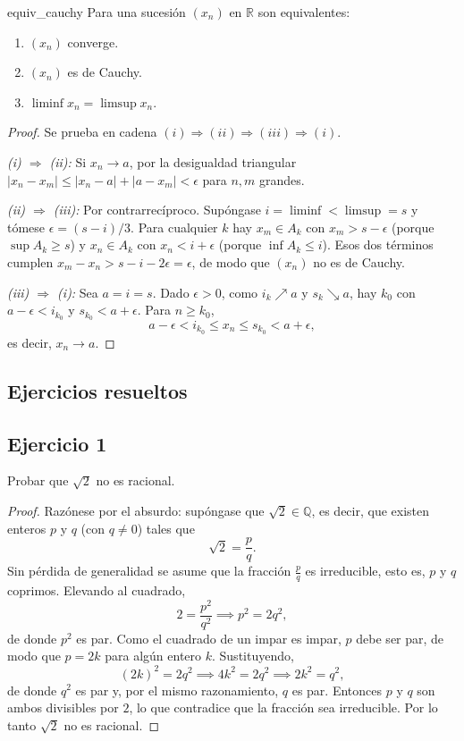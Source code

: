 \documentclass[11pt, a4paper]{article}
\begin{document}
\begin{teorema}{}{equiv_cauchy}
Para una sucesión $(x_n)$ en $\mathbb{R}$ son equivalentes:
\begin{enumerate}
    \item[i)] $(x_n)$ converge.
    \item[ii)] $(x_n)$ es de Cauchy.
    \item[iii)] $\liminf x_n = \limsup x_n$.
\end{enumerate}
\end{teorema}

\begin{proof}
Se prueba en cadena $(i) \Rightarrow (ii) \Rightarrow (iii) \Rightarrow (i)$.

\textit{(i) $\Rightarrow$ (ii):} Si $x_n \to a$, por la desigualdad triangular
$|x_n - x_m| \le |x_n - a| + |a - x_m| < \epsilon$ para $n, m$ grandes.

\textit{(ii) $\Rightarrow$ (iii):} Por contrarrecíproco. Supóngase $i = \liminf < \limsup = s$ y
tómese $\epsilon = (s-i)/3$. Para cualquier $k$ hay $x_m \in A_k$ con $x_m > s - \epsilon$ (porque
$\sup A_k \ge s$) y $x_n \in A_k$ con $x_n < i + \epsilon$ (porque $\inf A_k \le i$). Esos dos
términos cumplen $x_m - x_n > s - i - 2\epsilon = \epsilon$, de modo que $(x_n)$ no es de Cauchy.

\textit{(iii) $\Rightarrow$ (i):} Sea $a = i = s$. Dado $\epsilon > 0$, como $i_k \nearrow a$ y
$s_k \searrow a$, hay $k_0$ con $a - \epsilon < i_{k_0}$ y $s_{k_0} < a + \epsilon$. Para
$n \ge k_0$,
$$ a - \epsilon < i_{k_0} \le x_n \le s_{k_0} < a + \epsilon, $$
es decir, $x_n \to a$.
\end{proof}

\newpage

\subsection{Ejercicios resueltos}

\subsection*{Ejercicio 1}

Probar que $\sqrt{2}$ no es racional.

\begin{proof}
Razónese por el absurdo: supóngase que $\sqrt{2} \in \mathbb{Q}$, es decir, que existen enteros $p$
y $q$ (con $q \neq 0$) tales que
$$ \sqrt{2} = \frac{p}{q}. $$
Sin pérdida de generalidad se asume que la fracción $\frac{p}{q}$ es irreducible, esto es, $p$ y $q$
coprimos. Elevando al cuadrado,
$$ 2 = \frac{p^2}{q^2} \implies p^2 = 2q^2, $$
de donde $p^2$ es par. Como el cuadrado de un impar es impar, $p$ debe ser par, de modo que $p = 2k$ para
algún entero $k$. Sustituyendo,
$$ (2k)^2 = 2q^2 \implies 4k^2 = 2q^2 \implies 2k^2 = q^2, $$
de donde $q^2$ es par y, por el mismo razonamiento, $q$ es par. Entonces $p$ y $q$ son ambos
divisibles por $2$, lo que contradice que la fracción sea irreducible. Por lo tanto $\sqrt{2}$ no es
racional.
\end{proof}
\end{document}
